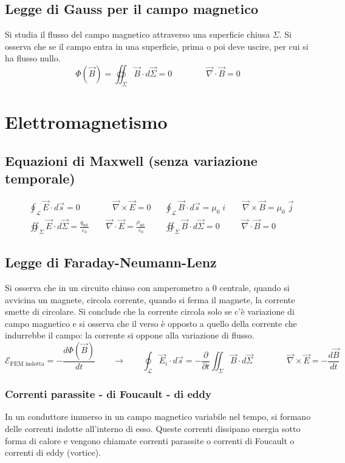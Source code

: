 \documentclass[a4paper]{article}
\newcommand\nab{\vec{\nabla}} %
\begin{document}
\subsection{Legge di Gauss per il campo magnetico}
Si studia il flusso del campo magnetico attraverso una superficie chiusa \(\Sigma\). Si osserva che se il campo
entra in una superficie, prima o poi deve uscire, per cui si ha flusso nullo.
\[\Phi(\vec{B}) = \oiint_\Sigma \vec{B} \cdot d\vec{\Sigma} = 0 \qquad \qquad \nab \cdot \vec{B} = 0\]

\newpage

\section{Elettromagnetismo}
\subsection{Equazioni di Maxwell (senza variazione temporale)}
\begin{align*}
	&\oint_\mathcal{L} \vec{E} \cdot d\vec{s} = 0 \qquad\quad\;\;\; \nab \times \vec{E} = 0 &&\oint_\mathcal{L} \vec{B} \cdot d\vec{s} = \mu_0 \; i \qquad \nab \times \vec{B} = \mu_0 \; \vec{j} \\[10pt]
	&\oiint_\Sigma \vec{E} \cdot d\vec{\Sigma} = \frac{q_\text{int}}{\varepsilon_0} \qquad \nab \cdot \vec{E} = \frac{\rho_\text{int}}{\varepsilon_0} &&\oiint_\Sigma \vec{B} \cdot d\vec{\Sigma} = 0 \qquad\;\; \nab \cdot \vec{B} = 0
\end{align*}

\subsection{Legge di Faraday-Neumann-Lenz}
Si osserva che in un circuito chiuso con amperometro a 0 centrale, quando si avvicina un magnete, circola corrente, quando si
ferma il magnete, la corrente smette di circolare. Si conclude che la corrente circola solo se c'è variazione di campo magnetico
e si osserva che il verso è opposto a quello della corrente che indurrebbe il campo: la corrente si oppone alla variazione di
flusso.
\[\mathcal{E}_\text{FEM indotta} = -\frac{d \Phi(\vec{B})}{dt} \qquad \rightarrow \qquad \oint_\mathcal{L} \vec{E}_i \cdot d\vec{s} = -\frac{\partial}{\partial t} \iint_\Sigma \vec{B} \cdot d\vec{\Sigma} \qquad\qquad \nab \times \vec{E} = -\frac{d\vec{B}}{dt}\]

\subsubsection*{Correnti parassite - di Foucault - di eddy}
In un conduttore immerso in un campo magnetico variabile nel tempo, si formano delle correnti indotte all'interno di esso. Queste
correnti dissipano energia sotto forma di calore e vengono chiamate correnti parassite o correnti di Foucault o correnti di eddy
(vortice).
\end{document}

